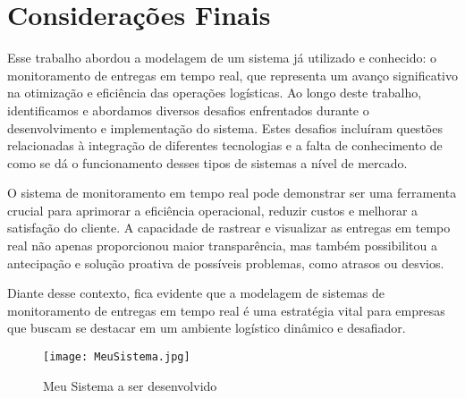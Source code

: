  

\chapter{Considera\c{c}\~{o}es Finais} 


Esse trabalho abordou a modelagem de um sistema já utilizado e conhecido: o monitoramento de entregas em tempo real, que representa um avanço significativo na otimização e eficiência das operações logísticas. Ao longo deste trabalho, identificamos e abordamos diversos desafios enfrentados durante o desenvolvimento e implementação do sistema. Estes desafios incluíram questões relacionadas à integração de diferentes tecnologias e a falta de conhecimento de como se dá o funcionamento desses tipos de sistemas a nível de mercado.

O sistema de monitoramento em tempo real pode demonstrar ser uma ferramenta crucial para aprimorar a eficiência operacional, reduzir custos e melhorar a satisfação do cliente. A capacidade de rastrear e visualizar as entregas em tempo real não apenas proporcionou maior transparência, mas também possibilitou a antecipação e solução proativa de possíveis problemas, como atrasos ou desvios.

Diante desse contexto, fica evidente que a modelagem de sistemas de monitoramento de entregas em tempo real é uma estratégia vital para empresas que buscam se destacar em um ambiente logístico dinâmico e desafiador.


   \begin{figure}[H]
    \begin{center}
        \texttt{[image: MeuSistema.jpg]}
        \caption{Meu Sistema a ser desenvolvido} \label{sistema}
    \end{center}
   \end{figure} 